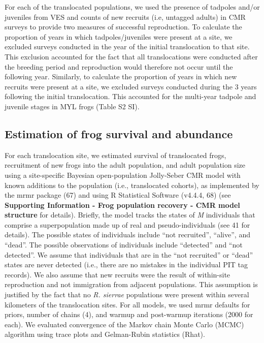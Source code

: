 \documentclass[9pt,twocolumn,twoside,lineno]{pnas-new}
\begin{document}
{For each of the translocated populations, we used the presence of
tadpoles and/or juveniles from VES and counts of new recruits (i.e,
untagged adults) in CMR surveys to provide two measures of successful
reproduction. To calculate the proportion of years in which
tadpoles/juveniles were present at a site, we excluded surveys conducted
in the year of the initial translocation to that site. This exclusion
accounted for the fact that all translocations were conducted after the
breeding period and reproduction would therefore not occur until the
following year. Similarly, to calculate the proportion of years in which
new recruits were present at a site, we excluded surveys conducted
during the 3 years following the initial translocation. This accounted
for the multi-year tadpole and juvenile stages in MYL frogs
(Table S2 SI).

\hypertarget{estimation-of-frog-survival-and-abundance}{%
\subsection*{Estimation of frog survival and
abundance}\label{estimation-of-frog-survival-and-abundance}}

For each translocation site, we estimated survival of translocated
frogs, recruitment of new frogs into the adult population, and adult
population size using a site-specific Bayesian open-population
Jolly-Seber CMR model with known additions to the population (i.e.,
translocated cohorts), as implemented by the mrmr package (67) and using
R Statistical Software (v4.4.4, 68) (see \textbf{Supporting Information
- Frog population recovery - CMR model structure} for details). Briefly,
the model tracks the states of \emph{M} individuals that comprise a
superpopulation made up of real and pseudo-individuals (see 41 for
details). The possible states of individuals include ``not recruited'',
``alive'', and ``dead''. The possible observations of individuals
include ``detected'' and ``not detected''. We assume that individuals
that are in the ``not recruited'' or ``dead'' states are never detected
(i.e., there are no mistakes in the individual PIT tag records). We also
assume that new recruits were the result of within-site reproduction and
not immigration from adjacent populations. This assumption is justified
by the fact that no \emph{R. sierrae} populations were present within
several kilometers of the translocation sites. For all models, we used
mrmr defaults for priors, number of chains (4), and warmup and
post-warmup iterations (2000 for each). We evaluated convergence of the
Markov chain Monte Carlo (MCMC) algorithm using trace plots and
Gelman-Rubin statistics (Rhat).

}
\end{document}
